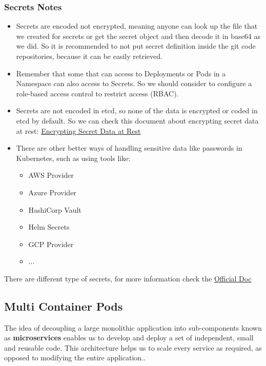 \documentclass{article}
\begin{document}
\subsubsection{Secrets Notes}
\begin{itemize}
    \item Secrets are encoded not encrypted, meaning anyone can look up the file that we created for secrets or get the secret object and then decode it in base64 as we did. So it is recommended to not put secret definition inside the git code repositories, because it can be easily retrieved.
    \item Remember that some that can access to Deployments or Pods in a Namespace can also access to Secrets. So we should consider to configure a role-based access control to restrict access (RBAC).
    \item Secrets are not encoded in etcd, so none of the data is encrypted or coded in etcd by default. So we can check this document about encrypting secret data at rest: \href{https://pwittrock.github.io/docs/tasks/administer-cluster/encrypt-data/}{Encrypting Secret Data at Rest}
    \item There are other better ways of handling sensitive data like passwords in Kubernetes, such as using tools like:
    \begin{itemize}
        \item AWS Provider
        \item Azure Provider
        \item HashiCorp Vault
        \item Helm Secrets
        \item GCP Provider
        \item ...
    \end{itemize}
\end{itemize}

There are different type of secrets, for more information check the \href{https://kubernetes.io/docs/concepts/configuration/secret/}{Official Doc}

\subsection{Multi Container Pods}
The idea of decoupling a large monolithic application into sub-components known as \textbf{microservices} enables us to develop and deploy a set of independent, small and reusable code. This architecture helps us to scale every service as required, as opposed to modifying the entire application.. 
\end{document}

